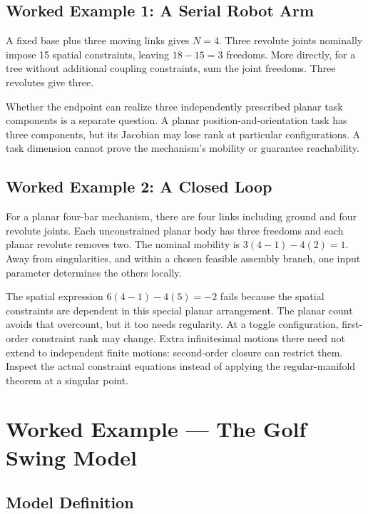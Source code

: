 \subsection{Worked Example 1: A Serial Robot Arm}
\label{ex:robot_arm_dof}

A fixed base plus three moving links gives $N=4$. Three revolute joints nominally impose 15 spatial constraints, leaving $18-15=3$ freedoms. More directly, for a tree without additional coupling constraints, sum the joint freedoms. Three revolutes give three.

Whether the endpoint can realize three independently prescribed planar task components is a separate question. A planar position-and-orientation task has three components, but its Jacobian may lose rank at particular configurations. A task dimension cannot prove the mechanism's mobility or guarantee reachability.

\subsection{Worked Example 2: A Closed Loop}
\label{ex:four_bar_loop}

For a planar four-bar mechanism, there are four links including ground and four revolute joints. Each unconstrained planar body has three freedoms and each planar revolute removes two. The nominal mobility is $3(4-1)-4(2)=1$. Away from singularities, and within a chosen feasible assembly branch, one input parameter determines the others locally.

The spatial expression $6(4-1)-4(5)=-2$ fails because the spatial constraints are dependent in this special planar arrangement. The planar count avoids that overcount, but it too needs regularity. At a toggle configuration, first-order constraint rank may change. Extra infinitesimal motions there need not extend to independent finite motions: second-order closure can restrict them. Inspect the actual constraint equations instead of applying the regular-manifold theorem at a singular point.

\section{Worked Example --- The Golf Swing Model}
\label{sec:golf_swing_dof}

\subsection{Model Definition}

